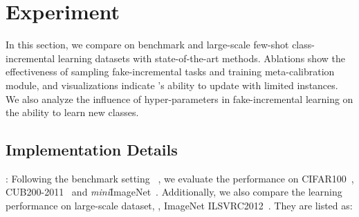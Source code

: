 



\section{Experiment}
In this section, we compare \name on benchmark and large-scale few-shot class-incremental learning datasets with state-of-the-art methods. Ablations show the effectiveness of sampling fake-incremental tasks and training meta-calibration module, and visualizations indicate \mame's ability to update with limited instances. We also analyze the influence of hyper-parameters in fake-incremental learning on the ability to learn new classes.





\subsection{Implementation Details}
: Following the benchmark setting ~\cite{tao2020few}, we evaluate the performance on CIFAR100~\cite{krizhevsky2009learning}, CUB200-2011~\cite{WahCUB2002011} and {\it mini}ImageNet~\cite{russakovsky2015imagenet}. Additionally, we also compare the learning performance on large-scale dataset, \ie, ImageNet ILSVRC2012~\cite{deng2009imagenet}.  They are listed as:


